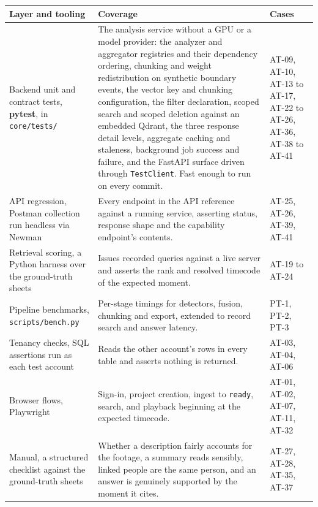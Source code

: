 \documentclass[11pt,a4paper]{article}
\begin{document}
\begin{center}
\centering
\footnotesize
\begin{tabularx}{\textwidth}{@{}L{3.1cm}XL{2.1cm}@{}}
\toprule
\textbf{Layer and tooling} & \textbf{Coverage} & \textbf{Cases} \\
\midrule
Backend unit and contract tests, \textbf{pytest}, in \texttt{core/tests/} &
The analysis service without a GPU or a model provider: the analyzer and aggregator
registries and their dependency ordering, chunking and weight redistribution on synthetic
boundary events, the vector key and chunking configuration, the filter declaration, scoped
search and scoped deletion against an embedded Qdrant, the three response detail levels,
aggregate caching and staleness, background job success and failure, and the FastAPI
surface driven through \texttt{TestClient}. Fast enough to run on every commit. &
AT-09, AT-10, AT-13 to AT-17, AT-22 to AT-26, AT-36, AT-38 to AT-41 \\
API regression, Postman collection run headless via Newman &
Every endpoint in the API reference against a running service, asserting status,
response shape and the capability endpoint's contents. & AT-25, AT-26, AT-39, AT-41 \\
Retrieval scoring, a Python harness over the ground-truth sheets &
Issues recorded queries against a live server and asserts the rank and resolved timecode of
the expected moment. & AT-19 to AT-24 \\
Pipeline benchmarks, \texttt{scripts/bench.py} &
Per-stage timings for detectors, fusion, chunking and export, extended to record search and
answer latency. & PT-1, PT-2, PT-3 \\
Tenancy checks, SQL assertions run as each test account &
Reads the other account's rows in every table and asserts nothing is returned. &
AT-03, AT-04, AT-06 \\
Browser flows, Playwright &
Sign-in, project creation, ingest to \texttt{ready}, search, and playback beginning at the
expected timecode. & AT-01, AT-02, AT-07, AT-11, AT-32 \\
\addlinespace[2pt]
Manual, a structured checklist against the ground-truth sheets &
Whether a description fairly accounts for the footage, a summary reads sensibly, linked
people are the same person, and an answer is genuinely supported by the moment it cites. &
AT-27, AT-28, AT-35, AT-37 \\
\bottomrule
\end{tabularx}
\end{center}
\end{document}
